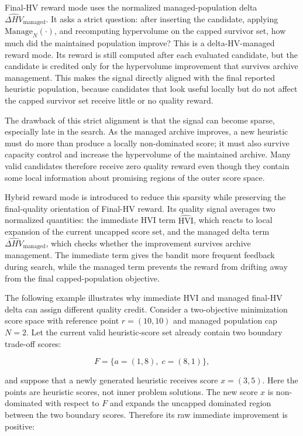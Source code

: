 \documentclass[../main.tex]{subfiles}
\begin{document}
Final-HV reward mode uses the normalized managed-population delta $\widehat{\Delta HV}_{\mathrm{managed}}$. It asks a strict question: after inserting the candidate, applying $\mathrm{Manage}_N(\cdot)$, and recomputing hypervolume on the capped survivor set, how much did the maintained population improve? This is a delta-HV-managed reward mode. Its reward is still computed after each evaluated candidate, but the candidate is credited only for the hypervolume improvement that survives archive management. This makes the signal directly aligned with the final reported heuristic population, because candidates that look useful locally but do not affect the capped survivor set receive little or no quality reward.

The drawback of this strict alignment is that the signal can become sparse, especially late in the search. As the managed archive improves, a new heuristic must do more than produce a locally non-dominated score; it must also survive capacity control and increase the hypervolume of the maintained archive. Many valid candidates therefore receive zero quality reward even though they contain some local information about promising regions of the outer score space.

Hybrid reward mode is introduced to reduce this sparsity while preserving the final-quality orientation of Final-HV reward. Its quality signal averages two normalized quantities: the immediate HVI term $\widehat{\mathrm{HVI}}$, which reacts to local expansion of the current uncapped score set, and the managed delta term $\widehat{\Delta HV}_{\mathrm{managed}}$, which checks whether the improvement survives archive management. The immediate term gives the bandit more frequent feedback during search, while the managed term prevents the reward from drifting away from the final capped-population objective.

The following example illustrates why immediate HVI and managed final-HV delta can assign different quality credit. Consider a two-objective minimization score space with reference point $r=(10,10)$ and managed population cap $N=2$. Let the current valid heuristic-score set already contain two boundary trade-off scores:

\begin{equation}
  F=\{a=(1,8),\; c=(8,1)\},
\end{equation}

and suppose that a newly generated heuristic receives score $x=(3,5)$. Here the points are heuristic scores, not inner problem solutions. The new score $x$ is non-dominated with respect to $F$ and expands the uncapped dominated region between the two boundary scores. Therefore its raw immediate improvement is positive:
\end{document}
